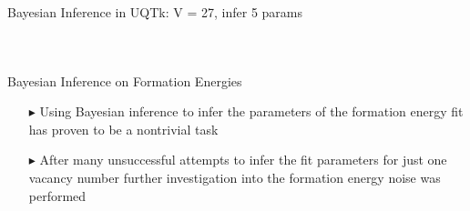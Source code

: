 \documentclass[10pt]{beamer}
\begin{document}
\begin{frame}{Bayesian Inference in UQTk: V = 27, infer 5 params}
\begin{columns}[c]
\begin{figure}[ht]
     		\end{figure}   		
	\end{columns}
\end{frame}

\begin{frame}{Bayesian Inference on Formation Energies}
	\large
	\begin{itemize}
	  \item[$\blacktriangleright$] Using Bayesian inference to infer the parameters
	  of the formation energy fit has proven to be a nontrivial task \newline
	  \item[$\blacktriangleright$] After many unsuccessful attempts to infer
	  the fit parameters for just one vacancy number further investigation into
	  the formation energy noise was performed
	\end{itemize}
\end{frame}
\end{document}
